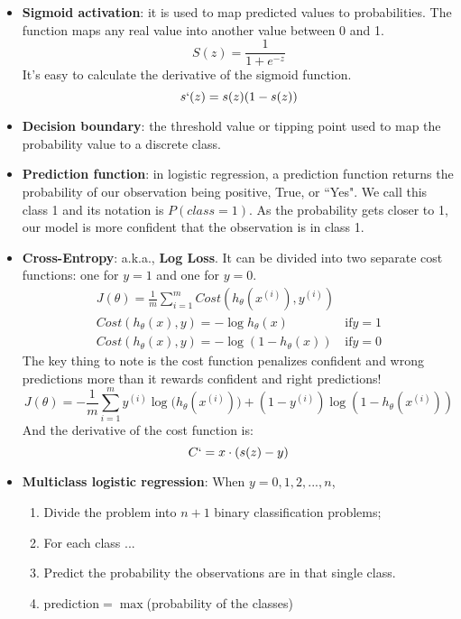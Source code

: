 \documentclass[]{article}
\begin{document}
\begin{itemize}
\begin{itemize}
		\item \textbf{Sigmoid activation}: it is used to map predicted values to probabilities. The function maps any real value into another value between 0 and 1.
		\begin{equation}
		S(z)=\frac{1}{1+e^{-z}}
		\end{equation}
		It's easy to calculate the derivative of the sigmoid function.
		\begin{equation}
		s`(z)=s(z)(1-s(z))
		\end{equation}
		
		\item \textbf{Decision boundary}: the threshold value or tipping point used to map the probability value to a discrete class.
		
		\item \textbf{Prediction function}: in logistic regression, a prediction function returns the probability of our observation being positive, True, or ``Yes". We call this class 1 and its notation is $P(class=1)$. As the probability gets closer to 1, our model is more confident that the observation is in class 1.
		
		\item \textbf{Cross-Entropy}: a.k.a., \textbf{Log Loss}. It can be divided into two separate cost functions: one for $y=1$ and one for $y=0$.
		\begin{equation}
		\begin{array}{cc}
		J(\theta)=\frac{1}{m}{\sum_{i=1}^{m}{Cost(h_{\theta}(x^{(i)}),y^{(i)})}} &  \\
		Cost(h_{\theta}(x),y) = -\log{h_{\theta}(x)} & \mathrm{if} y=1 \\
		Cost(h_{\theta}(x),y) = -\log{(1-h_{\theta}(x))} & \mathrm{if} y=0
		\end{array}
		\end{equation}
		The key thing to note is the cost function penalizes confident and wrong predictions more than it rewards confident and right predictions!
		\begin{equation}
		J(\theta)=-\frac{1}{m}{\sum_{i=1}^{m}{y^{(i)}\log{(h_{\theta}(x^{(i)})})}+(1-y^{(i)})\log{(1-h_{\theta}(x^{(i)}))}}
		\end{equation}
		And the derivative of the cost function is:
		\begin{equation}
		C`=x\cdot {(s(z)-y)}
		\end{equation}

		\item \textbf{Multiclass logistic regression}: When $y=0,1,2,...,n$,
		\begin{enumerate}
			\item Divide the problem into $n+1$ binary classification problems;
			\item For each class ...
			\item Predict the probability the observations are in that single class.
			\item prediction$=\max{}$(probability of the classes)
		\end{enumerate}
		

\end{itemize}
\end{itemize}
\end{document}
